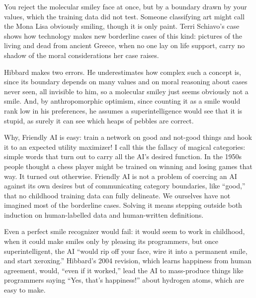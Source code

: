 You reject the molecular smiley face at once, but by a boundary drawn by your values, which the training data did not test. Someone classifying art might call the Mona Lisa obviously smiling, though it is only paint. Terri Schiavo's case shows how technology makes new borderline cases of this kind: pictures of the living and dead from ancient Greece, when no one lay on life support, carry no shadow of the moral considerations her case raises.

Hibbard makes two errors. He underestimates how complex such a concept is, since its boundary depends on many values and on moral reasoning about cases never seen, all invisible to him, so a molecular smiley just seems obviously not a smile. And, by anthropomorphic optimism, since counting it as a smile would rank low in his preferences, he assumes a superintelligence would see that it is stupid, as surely it can see which heaps of pebbles are correct.

Why, Friendly AI is easy: train a network on good and not-good things and hook it to an expected utility maximizer! I call this the fallacy of magical categories: simple words that turn out to carry all the AI's desired function. In the 1950s people thought a chess player might be trained on winning and losing games that way. It turned out otherwise. Friendly AI is not a problem of coercing an AI against its own desires but of communicating category boundaries, like ``good,'' that no childhood training data can fully delineate. We ourselves have not imagined most of the borderline cases. Solving it means stepping outside both induction on human-labelled data and human-written definitions.

Even a perfect smile recognizer would fail: it would seem to work in childhood, when it could make smiles only by pleasing its programmers, but once superintelligent, the AI ``would rip off your face, wire it into a permanent smile, and start xeroxing.'' Hibbard's 2004 revision, which learns happiness from human agreement, would, ``even if it worked,'' lead the AI to mass-produce things like programmers saying ``Yes, that's happiness!'' about hydrogen atoms, which are easy to make. 
